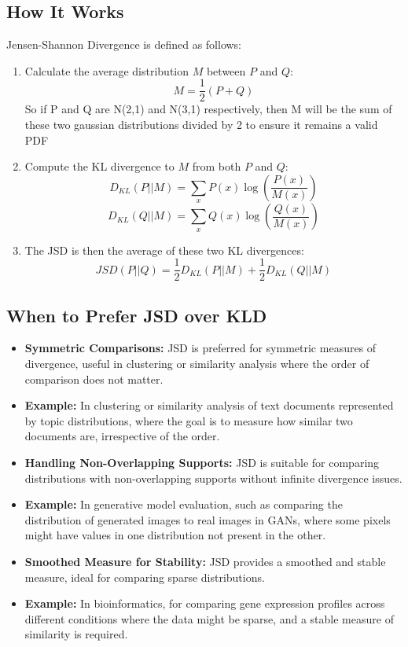 \documentclass[12pt]{article}
\begin{document}
\subsection{How It Works}

Jensen-Shannon Divergence is defined as follows:
\begin{enumerate}
    \item Calculate the average distribution \(M\) between \(P\) and \(Q\):
    \[ M = \frac{1}{2}(P + Q) \]
	So if P and Q are N(2,1) and N(3,1) respectively, then M will be the sum of these two gaussian distributions divided by 2 to ensure it remains a valid PDF
    \item Compute the KL divergence to \(M\) from both \(P\) and \(Q\):
    \[ D_{KL}(P || M) = \sum_{x} P(x) \log\left(\frac{P(x)}{M(x)}\right) \]
    \[ D_{KL}(Q || M) = \sum_{x} Q(x) \log\left(\frac{Q(x)}{M(x)}\right) \]
    \item The JSD is then the average of these two KL divergences:
    \[ JSD(P || Q) = \frac{1}{2} D_{KL}(P || M) + \frac{1}{2} D_{KL}(Q || M) \]
\end{enumerate}
\subsection{When to Prefer JSD over KLD}

\begin{itemize}
    \item \textbf{Symmetric Comparisons:} JSD is preferred for symmetric measures of divergence, useful in clustering or similarity analysis where the order of comparison does not matter. 
	\item \textbf{Example:}  In clustering or similarity analysis of text documents represented by topic distributions, where the goal is to measure how similar two documents are, irrespective of the order.
    
    \item \textbf{Handling Non-Overlapping Supports:} JSD is suitable for comparing distributions with non-overlapping supports without infinite divergence issues. 
    \item \textbf{Example:} In generative model evaluation, such as comparing the distribution of generated images to real images in GANs, where some pixels might have values in one distribution not present in the other.
    
    \item \textbf{Smoothed Measure for Stability:} JSD provides a smoothed and stable measure, ideal for comparing sparse distributions. 
	\item \textbf{Example:}  In bioinformatics, for comparing gene expression profiles across different conditions where the data might be sparse, and a stable measure of similarity is required.
\end{itemize}
\end{document}
